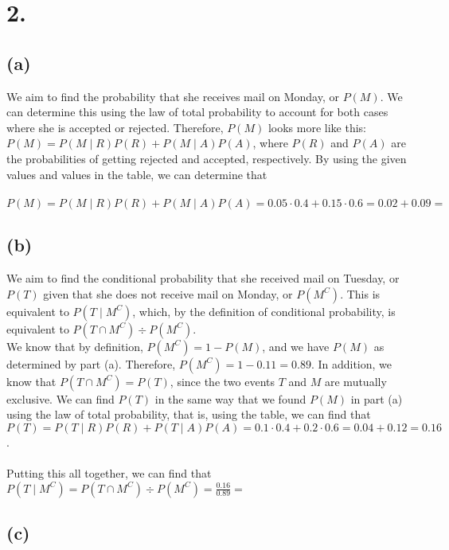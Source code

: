 \documentclass{article}
\begin{document}
\section*{2.}
{\Large

\subsection*{(a)}

We aim to find the probability that she receives mail on Monday, or $P(M)$. We can determine this using the law of total probability to account for both cases where she is accepted or rejected. Therefore, $P(M)$ looks more like this: \\
$P(M) = P(M \mid R)P(R) + P(M \mid A)P(A)$, where $P(R)$ and $P(A)$ are the probabilities of getting rejected and accepted, respectively. By using the given values and values in the table, we can determine that \\ \\
$P(M) = P(M \mid R)P(R) + P(M \mid A)P(A) = 0.05 \cdot 0.4 + 0.15 \cdot 0.6 = 0.02 + 0.09 = $ 

\subsection*{(b)}

We aim to find the conditional probability that she received mail on Tuesday, or $P(T)$ given that she does not receive mail on Monday, or $P(M^C)$. This is equivalent to $P(T \mid M^C)$, which, by the definition of conditional probability, is equivalent to $P(T \cap M^C) \div P(M^C)$. \\ 
We know that by definition, $P(M^C) = 1 - P(M)$, and we have $P(M)$ as determined by part (a). Therefore, $P(M^C) = 1 - 0.11 = 0.89$. In addition, we know that $P(T \cap M^C) = P(T)$, since the two events $T$ and $M$ are mutually exclusive. We can find $P(T)$ in the same way that we found $P(M)$ in part (a) using the law of total probability, that is, using the table, we can find that $P(T) = P(T \mid R)P(R) + P(T \mid A)P(A) = 0.1 \cdot 0.4 + 0.2 \cdot 0.6 = 0.04 + 0.12 = 0.16$. \\ \\ 
Putting this all together, we can find that $P(T \mid M^C) = P(T \cap M^C) \div P(M^C) = \frac{0.16}{0.89} = $ 

\subsection*{(c)}

}
\end{document}
